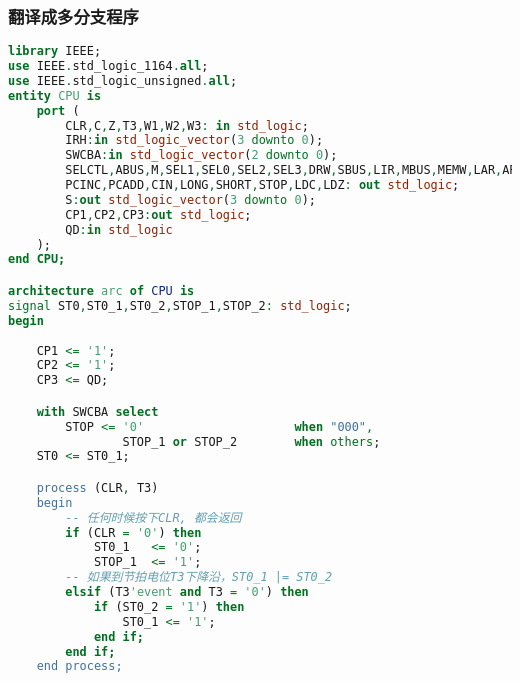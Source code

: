 \documentclass[UTF8]{ctexart}
\begin{document}
\subsubsection{翻译成多分支程序}
{\firacode
\begin{lstlisting}[language={VHDL}]
library IEEE;
use IEEE.std_logic_1164.all;
use IEEE.std_logic_unsigned.all;
entity CPU is
	port (
		CLR,C,Z,T3,W1,W2,W3: in std_logic;
		IRH:in std_logic_vector(3 downto 0);
		SWCBA:in std_logic_vector(2 downto 0);
		SELCTL,ABUS,M,SEL1,SEL0,SEL2,SEL3,DRW,SBUS,LIR,MBUS,MEMW,LAR,ARINC,LPC,
		PCINC,PCADD,CIN,LONG,SHORT,STOP,LDC,LDZ: out std_logic;
		S:out std_logic_vector(3 downto 0);
		CP1,CP2,CP3:out std_logic;	
		QD:in std_logic	
	);
end CPU;

architecture arc of CPU is
signal ST0,ST0_1,ST0_2,STOP_1,STOP_2: std_logic;
begin
	
	CP1 <= '1';
	CP2 <= '1';
	CP3 <= QD;

	with SWCBA select
		STOP <= '0'						when "000",
				STOP_1 or STOP_2 		when others;
	ST0 <= ST0_1;

	process (CLR, T3)
	begin
		-- 任何时候按下CLR, 都会返回
		if (CLR = '0') then
			ST0_1	<= '0';
			STOP_1	<= '1';
		-- 如果到节拍电位T3下降沿，ST0_1 |= ST0_2
		elsif (T3'event and T3 = '0') then
			if (ST0_2 = '1') then
				ST0_1 <= '1';
			end if;
		end if;
	end process;


\end{lstlisting}}
\end{document}
